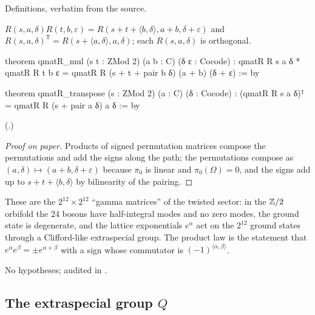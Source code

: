 \begin{status}
Definitions, verbatim from the source.
\end{status}
\begin{theorem}\label{ch21:thm:qmatRmul}
$R(s,a,\delta)R(t,b,\varepsilon)=R(s+t+\langle b,\delta\rangle,a+b,\delta+\varepsilon)$ and
$R(s,a,\delta)^{\mathsf T}=R(s+\langle a,\delta\rangle,a,\delta)$; each $R(s,a,\delta)$ is orthogonal.
\end{theorem}
\begin{leancode}
theorem qmatR_mul (s t : ZMod 2) (a b : C) (δ ε : Cocode) :
    qmatR R s a δ * qmatR R t b ε = qmatR R (s + t + pair b δ) (a + b) (δ + ε) := by
\end{leancode}
\begin{leancode}
theorem qmatR_transpose (s : ZMod 2) (a : C) (δ : Cocode) :
    (qmatR R s a δ)ᵀ = qmatR R (s + pair a δ) a δ := by
\end{leancode}
(.)
\begin{proof}[Proof on paper]
Products of signed permutation matrices compose the permutations and add the signs along the path;
the permutations compose as $(a,\delta)\mapsto(a+b,\delta+\varepsilon)$ because $\pi_0$ is linear and
$\pi_0(\Omega)=0$, and the signs add up to $s+t+\langle b,\delta\rangle$ by bilinearity of the pairing.
\end{proof}
\begin{physics}
These are the $2^{12}\times2^{12}$ ``gamma matrices'' of the twisted sector: in the ${\mathbb{Z}}/2$ orbifold
the $24$ bosons have half-integral modes and no zero modes, the ground state is degenerate, and the
lattice exponentials $e^\alpha$ act on the $2^{12}$ ground states through a Clifford-like extraspecial
group.  The product law is the statement that $e^{\alpha}e^{\beta}=\pm e^{\alpha+\beta}$ with a sign
whose commutator is $(-1)^{\langle\alpha,\beta\rangle}$.
\end{physics}
\begin{status}
No hypotheses;  audited in .
\end{status}

\subsection{The extraspecial group \texorpdfstring{$Q$}{Q}}

